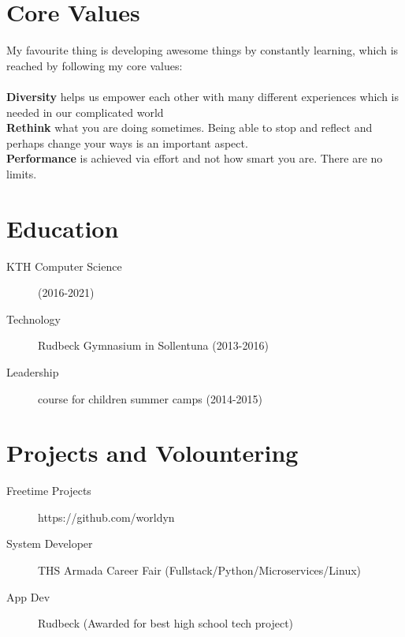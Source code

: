 \documentclass[margin,line,a4paper]{resume}
\begin{document}
\begin{resume}
\section{\mysidestyle Core Values}\vspace{1mm}
    My favourite thing is developing awesome things by constantly learning, which is reached by following my core values: 
    \\
    \\
    \textbf{Diversity} helps us empower each other with many different experiences which is needed in our complicated world
    \\
    \textbf{Rethink} what you are doing sometimes. Being able to stop and reflect and perhaps change your ways is an important aspect.
    \\
    \textbf{Performance} is achieved via effort and not how smart you are. There are no limits.

\section{\mysidestyle Education}\vspace{1mm}
    \begin{description}
        \item[KTH Computer Science] (2016-2021)
        \item[Technology] Rudbeck Gymnasium in Sollentuna (2013-2016)
        \item[Leadership] course for children summer camps (2014-2015)
    \end{description} 

\section{\mysidestyle Projects and Volountering}\vspace{1mm}
\begin{description}
    \item[Freetime Projects] https://github.com/worldyn
    \item[System Developer] THS Armada Career Fair (Fullstack/Python/Microservices/Linux)
    \item[App Dev] Rudbeck (Awarded for best high school tech project)

\end{description}  
  

\end{resume}
\end{document}
